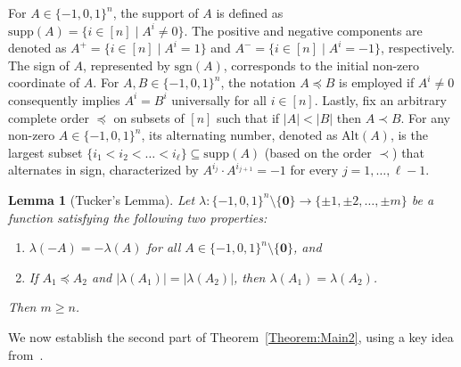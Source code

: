 \documentclass[preprint,12pt,3p]{elsarticle}
\newtheorem{lemma}[theorem]{Lemma}
\begin{document}
For $A \in \{-1, 0, 1\}^n$, the support of $A$ is defined as $\text{supp}(A) = \{i \in [n] \mid A^i \ne 0\}$. The positive and negative components are denoted as $A^+ = \{i \in [n] \mid A^i = 1\}$ and $A^- = \{i \in [n] \mid A^i = -1\}$, respectively. The sign of $A$, represented by $\text{sgn}(A)$, corresponds to the initial non-zero coordinate of $A$. For $A, B \in \{-1, 0, 1\}^n$, the notation $A \preceq B$ is employed if $A^i \ne 0$ consequently implies $A^i = B^i$ universally for all $i \in [n]$. Lastly, fix an arbitrary complete order $\preceq$ on subsets of $[n]$ such that if $|A|<|B|$ then $A\prec B$. For any non-zero $A \in \{-1, 0, 1\}^n$, its alternating number, denoted as $\text{Alt}(A)$, is the largest subset $\{i_1 < i_2 < \dots < i_\ell\} \subseteq \text{supp}(A)$ (based on the order $\prec$) that alternates in sign, characterized by $A^{i_j} \cdot A^{i_{j+1}} = -1$ for every $j = 1, \dots, \ell-1$.
 
\begin{lemma}[Tucker's Lemma]\label{lem:tucker}
Let $\lambda: \{-1, 0, 1\}^n \setminus \{\mathbf{0}\} \to \{\pm 1, \pm 2, \dots, \pm m\}$ be a function satisfying the following two properties:
    \begin{enumerate}
        \item $\lambda(-A) = -\lambda(A)$ for all $A \in \{-1, 0, 1\}^n \setminus \{\mathbf{0}\}$, and
        \item If $A_1 \preceq A_2$ and $|\lambda(A_1)| = |\lambda(A_2)|$, then $\lambda(A_1) = \lambda(A_2)$.
    \end{enumerate}
    Then $m \geq n$.
\end{lemma}
We now establish the second part of Theorem~\ref{Theorem:Main2}, using a key idea from~\cite{chen2015multichromatic}.
\end{document}
